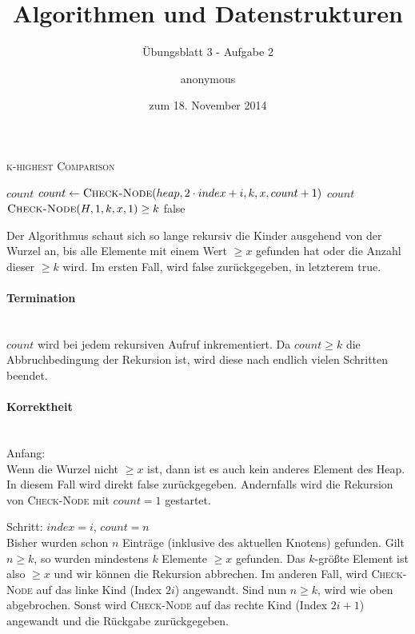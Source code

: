 \documentclass[a4paper]{scrartcl}
\title{Algorithmen und Datenstrukturen}
\subtitle{Übungsblatt 3 - Aufgabe 2}
\author{
    anonymous
}
\date{zum 18. November 2014}
\begin{document}
\maketitle


\begin{algorithm}
    \caption{\textsc{k-highest Comparison}}
    \begin{algorithmic}[1]
                    \State \Return $count$
                \EndIf
                    \State $count \gets \Call{Check-Node}{heap, 2 \cdot index + i, k, x, count + 1}$
                \EndIf
            \EndFor
            \State \Return $count$
        \EndProcedure
        \Statex
                \State \Return $\Call{Check-Node}{H, 1, k, x, 1} \geq k$
            \EndIf
            \State \Return false
        \EndProcedure
    \end{algorithmic}
\end{algorithm}

Der Algorithmus schaut sich so lange rekursiv die Kinder ausgehend von der
Wurzel an, bis alle Elemente mit einem Wert $\geq x$ gefunden hat oder die
Anzahl dieser $\geq k$ wird.
Im ersten Fall, wird false zurückgegeben, in letzterem true.

\paragraph{Termination} \hfill \\
$count$ wird bei jedem rekursiven Aufruf inkrementiert.
Da $count \geq k$ die Abbruchbedingung der Rekursion ist, wird diese nach
endlich vielen Schritten beendet.

\paragraph{Korrektheit} \hfill \\
Anfang: \\
Wenn die Wurzel nicht $\geq x$ ist, dann ist es auch kein anderes Element des
Heap.
In diesem Fall wird direkt false zurückgegeben.
Andernfalls wird die Rekursion von \textsc{Check-Node} mit $count = 1$
gestartet.

Schritt: $index = i$, $count = n$ \\
Bisher wurden schon $n$ Einträge (inklusive des aktuellen Knotens) gefunden.
Gilt $n \geq k$, so wurden mindestens $k$ Elemente $\geq x$ gefunden.
Das $k$-größte Element ist also $\geq x$ und wir können die Rekursion abbrechen.
Im anderen Fall, wird \textsc{Check-Node} auf das linke Kind (Index $2i$)
angewandt.
Sind nun $n \geq k$, wird wie oben abgebrochen.
Sonst wird \textsc{Check-Node} auf das rechte Kind (Index $2i+1$) angewandt und
die Rückgabe zurückgegeben.
\end{document}
